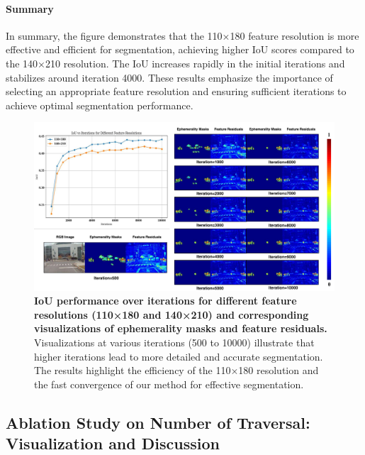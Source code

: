 \paragraph{Summary} In summary, the figure demonstrates that the 110×180 feature resolution is more effective and efficient for segmentation, achieving higher IoU scores compared to the 140×210 resolution. The IoU increases rapidly in the initial iterations and stabilizes around iteration 4000. These results emphasize the importance of selecting an appropriate feature resolution and ensuring sufficient iterations to achieve optimal segmentation performance.

\vspace{5mm}

\begin{figure}[ht]
\begin{center}
\centerline{\includegraphics[width=\columnwidth]{figs_compressed/ablation-iteration_compressed.pdf}}
\caption{ \textbf{IoU performance over iterations for different feature resolutions (110×180 and 140×210) and corresponding visualizations of ephemerality masks and feature residuals.} Visualizations at various iterations (500 to 10000) illustrate that higher iterations lead to more detailed and accurate segmentation. The results highlight the efficiency of the 110×180 resolution and the fast convergence of our method for effective segmentation.}
\label{fig:ablation-iteration-appendix}
\end{center}
\end{figure}





\clearpage




\subsection{Ablation Study on Number of Traversal: Visualization and Discussion}

